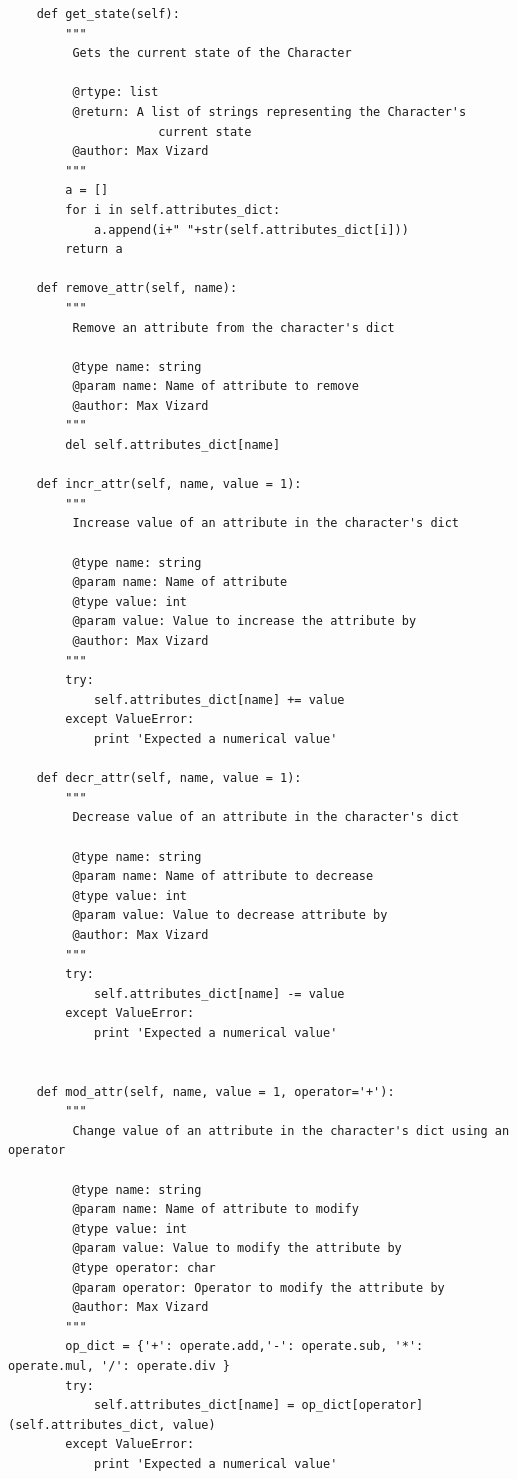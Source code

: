 \documentclass[11pt]{report}
\begin{document}
\begin{verbatim}
    def get_state(self):
        """
         Gets the current state of the Character
         
         @rtype: list
         @return: A list of strings representing the Character's
                     current state
         @author: Max Vizard
        """
        a = []
        for i in self.attributes_dict:
            a.append(i+" "+str(self.attributes_dict[i]))
        return a

    def remove_attr(self, name):
        """
         Remove an attribute from the character's dict

         @type name: string
         @param name: Name of attribute to remove
         @author: Max Vizard 
        """
        del self.attributes_dict[name]

    def incr_attr(self, name, value = 1):
        """
         Increase value of an attribute in the character's dict

         @type name: string
         @param name: Name of attribute
         @type value: int
         @param value: Value to increase the attribute by
         @author: Max Vizard
        """
        try:
            self.attributes_dict[name] += value
        except ValueError:
            print 'Expected a numerical value'

    def decr_attr(self, name, value = 1):
        """
         Decrease value of an attribute in the character's dict

         @type name: string
         @param name: Name of attribute to decrease
         @type value: int
         @param value: Value to decrease attribute by
         @author: Max Vizard
        """
        try:
            self.attributes_dict[name] -= value
        except ValueError:
            print 'Expected a numerical value'
            

    def mod_attr(self, name, value = 1, operator='+'):
        """
         Change value of an attribute in the character's dict using an operator

         @type name: string
         @param name: Name of attribute to modify
         @type value: int
         @param value: Value to modify the attribute by
         @type operator: char
         @param operator: Operator to modify the attribute by
         @author: Max Vizard
        """
        op_dict = {'+': operate.add,'-': operate.sub, '*': operate.mul, '/': operate.div }
        try:
            self.attributes_dict[name] = op_dict[operator](self.attributes_dict, value)
        except ValueError:
            print 'Expected a numerical value' 


\end{verbatim}
\end{document}
